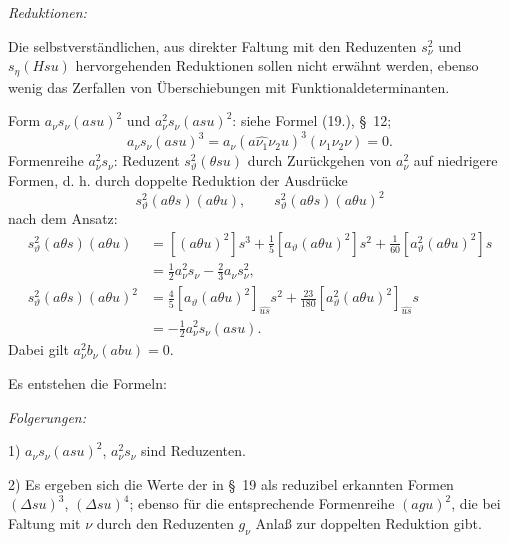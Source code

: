 \noindent\emph{Reduktionen:}

Die selbstverständlichen, aus direkter Faltung mit den Reduzenten $s_\nu^2$ und $s_\eta(Hsu)$ hervorgehenden Reduktionen sollen nicht erwähnt werden, ebenso wenig das Zerfallen von Überschiebungen mit Funktionaldeterminanten.

Form $a_\nu s_\nu(asu)^2$ und $a_\nu^2s_\nu(asu)^2$: siehe Formel (19.), \S\ 12;
\[
a_\nu s_\nu(asu)^3=a_\nu(a\widehat{\nu_1}\nu_2u)^3(\nu_1\nu_2\nu)=0.
\]
Formenreihe $a_\nu^2s_\nu$: Reduzent $s_\vartheta^2(\theta su)$ durch Zurückgehen von $a_\nu^2$ auf niedrigere Formen, d. h. durch doppelte Reduktion der Ausdrücke
\[
s_\vartheta^2(a\theta s)(a\theta u),\qquad
s_\vartheta^2(a\theta s)(a\theta u)^2
\]
nach dem Ansatz:
\[
\begin{aligned}
s_\vartheta^2(a\theta s)(a\theta u)
&=[(a\theta u)^2]s^3+\frac15[a_\vartheta(a\theta u)^2]s^2+\frac1{60}[a_\vartheta^2(a\theta u)^2]s\\
&=\frac12a_\nu^2s_\nu-\frac23a_\nu s_\nu^2,\\
s_\vartheta^2(a\theta s)(a\theta u)^2
&=\frac45[a_\vartheta(a\theta u)^2]_{\widehat{us}}s^2+\frac{23}{180}[a_\vartheta^2(a\theta u)^2]_{\widehat{us}}s\\
&=-\frac12a_\nu^2s_\nu(asu).
\end{aligned}
\]
Dabei gilt $a_\nu^2b_\nu(abu)=0$.

Es entstehen die Formeln:

\noindent\emph{Folgerungen:}

1) $a_\nu s_\nu(asu)^2$, $a_\nu^2s_\nu$ sind Reduzenten.

2) Es ergeben sich die Werte der in \S\ 19 als reduzibel erkannten Formen $(\Delta su)^3$, $(\Delta su)^4$; ebenso für die entsprechende Formenreihe $(agu)^2$, die bei Faltung mit $\nu$ durch den Reduzenten $g_\nu$ Anlaß zur doppelten Reduktion gibt.

